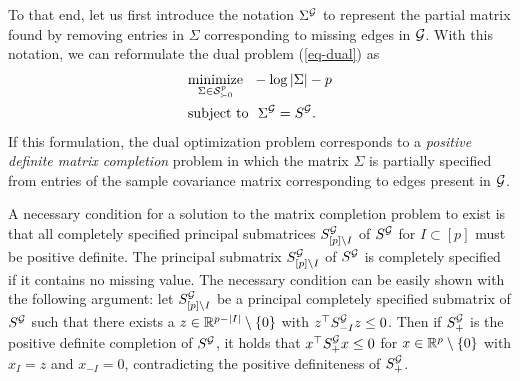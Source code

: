 To that end, let us first introduce the notation $\Sigma^{\mathcal{G}}$ to represent the partial matrix found by removing entries in $\Sigma$ corresponding to missing edges in ${\mathcal{G}}$. With this notation, we can reformulate the dual problem (\ref{eq-dual}) as
\begin{align*}
        &\underset{\Sigma \in \S^p_{\succ 0}}{\textrm{minimize}}\ \  -\log |\Sigma| - p\\
        &\textrm{subject to}\ \ \Sigma^\G = S^\G.
\end{align*}
If this formulation, the dual optimization problem corresponds to a \textit{positive definite matrix completion} problem in which the matrix $\Sigma$ is partially specified from entries of the sample covariance matrix corresponding to edges present in ${\mathcal{G}}$. 

A necessary condition for a solution to the matrix completion problem to exist is that all completely specified principal submatrices $S^{\mathcal{G}}_{[p]\setminus I}$ of $S^{\mathcal{G}}$ for $I \subset [p]$ must be positive definite. The principal submatrix $S^{\mathcal{G}}_{[p]\setminus I}$ of $S^{\mathcal{G}}$ is completely specified if it contains no missing value. The necessary condition can be easily shown with the following argument: let $S^{\mathcal{G}}_{[p]\setminus I}$ be a principal completely specified submatrix of $S^{\mathcal{G}}$ such that there exists a $z \in \mathbb{R}^{p-|I|}\setminus {\left\{0\right\}}$ with $z^\top S^{\mathcal{G}}_{-I} z \leq 0$. Then if $S^{\mathcal{G}}_+$ is the positive definite completion of $S^{\mathcal{G}}$, it holds that $x^\top S^{\mathcal{G}}_+ x \leq 0$ for $x \in \mathbb{R}^p \setminus {\left\{0\right\}}$ with $x_I = z$ and $x_{-I} = 0$, contradicting the positive definiteness of $S^{\mathcal{G}}_+$.


